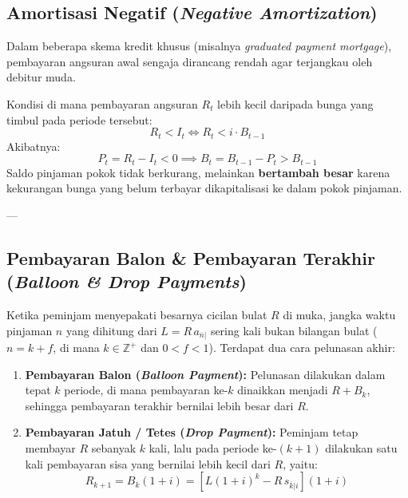 \documentclass[11pt,a4paper]{article}
\begin{document}
\subsection{Amortisasi Negatif (\textit{Negative Amortization})}

Dalam beberapa skema kredit khusus (misalnya \textit{graduated payment mortgage}), pembayaran angsuran awal sengaja dirancang rendah agar terjangkau oleh debitur muda.

\begin{definitionbox}
Kondisi di mana pembayaran angsuran $R_t$ lebih kecil daripada bunga yang timbul pada periode tersebut:
\begin{equation}
    R_t < I_t \iff R_t < i \cdot B_{t-1}
\end{equation}
Akibatnya:
\begin{equation}
    P_t = R_t - I_t < 0 \implies B_t = B_{t-1} - P_t > B_{t-1}
\end{equation}
Saldo pinjaman pokok tidak berkurang, melainkan \textbf{bertambah besar} karena kekurangan bunga yang belum terbayar dikapitalisasi ke dalam pokok pinjaman.
\end{definitionbox}

---

\subsection{Pembayaran Balon \& Pembayaran Terakhir (\textit{Balloon \& Drop Payments})}

Ketika peminjam menyepakati besarnya cicilan bulat $R$ di muka, jangka waktu pinjaman $n$ yang dihitung dari $L = R \, a_{\overline{n}|}$ sering kali bukan bilangan bulat ($n = k + f$, di mana $k \in \mathbb{Z}^+$ dan $0 < f < 1$). Terdapat dua cara pelunasan akhir:

\begin{enumerate}[label=\textbf{\arabic*.}]
    \item \textbf{Pembayaran Balon (\textit{Balloon Payment}):}
    Pelunasan dilakukan dalam tepat $k$ periode, di mana pembayaran ke-$k$ dinaikkan menjadi $R + B_k$, sehingga pembayaran terakhir bernilai lebih besar dari $R$.
    \item \textbf{Pembayaran Jatuh / Tetes (\textit{Drop Payment}):}
    Peminjam tetap membayar $R$ sebanyak $k$ kali, lalu pada periode ke-$(k+1)$ dilakukan satu kali pembayaran sisa yang bernilai lebih kecil dari $R$, yaitu:
    \begin{equation}
        R_{k+1} = B_k (1+i) = [L(1+i)^k - R \, s_{\overline{k}|i}](1+i)
    \end{equation}
\end{enumerate}
\end{document}
